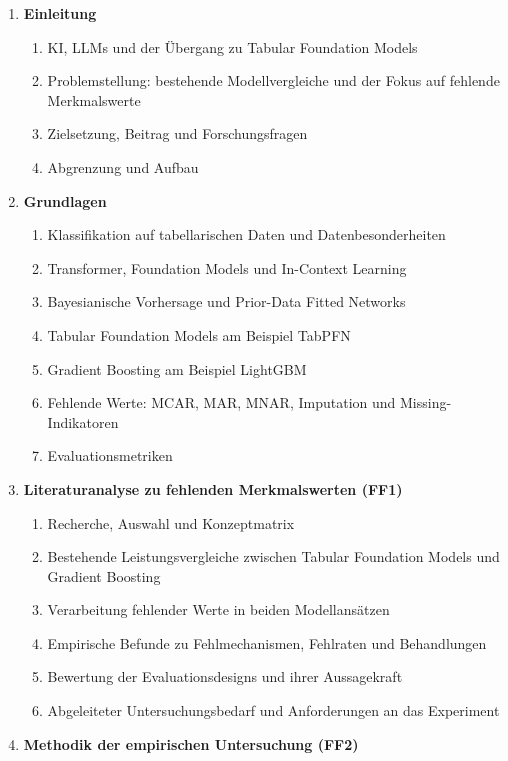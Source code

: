 \documentclass[11pt,a4paper]{article}
\begin{document}
\begin{enumerate}
  \item \textbf{Einleitung}
    \begin{enumerate}
      \item KI, LLMs und der Übergang zu Tabular Foundation Models
      \item Problemstellung: bestehende Modellvergleiche und der Fokus
            auf fehlende Merkmalswerte
      \item Zielsetzung, Beitrag und Forschungsfragen
      \item Abgrenzung und Aufbau
    \end{enumerate}
  \item \textbf{Grundlagen}
    \begin{enumerate}
      \item Klassifikation auf tabellarischen Daten und Datenbesonderheiten
      \item Transformer, Foundation Models und In-Context Learning
      \item Bayesianische Vorhersage und Prior-Data Fitted Networks
      \item Tabular Foundation Models am Beispiel TabPFN
      \item Gradient Boosting am Beispiel LightGBM
      \item Fehlende Werte: MCAR, MAR, MNAR, Imputation und
            Missing-Indikatoren
      \item Evaluationsmetriken
    \end{enumerate}
  \item \textbf{Literaturanalyse zu fehlenden Merkmalswerten (FF1)}
    \begin{enumerate}
      \item Recherche, Auswahl und Konzeptmatrix
      \item Bestehende Leistungsvergleiche zwischen Tabular Foundation
            Models und Gradient Boosting
      \item Verarbeitung fehlender Werte in beiden Modellansätzen
      \item Empirische Befunde zu Fehlmechanismen, Fehlraten und
            Behandlungen
      \item Bewertung der Evaluationsdesigns und ihrer Aussagekraft
      \item Abgeleiteter Untersuchungsbedarf und Anforderungen an das
            Experiment
    \end{enumerate}
  \item \textbf{Methodik der empirischen Untersuchung (FF2)}

\end{enumerate}
\end{document}
